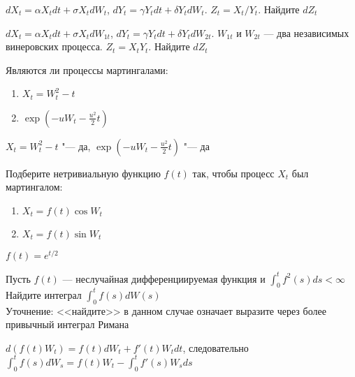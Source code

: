 \begin{problem}
 $dX_{t}=\alpha X_{t}dt+\sigma X_{t}dW_{t}$, $dY_{t}=\gamma Y_{t}dt+\delta Y_{t}dW_{t}$. $Z_{t}=X_{t}/Y_{t}$. Найдите $dZ_{t}$

\begin{sol}

\end{sol}
\end{problem}

\begin{problem}
 $dX_{t}=\alpha X_{t}dt+\sigma X_{t}dW_{1t}$, $dY_{t}=\gamma Y_{t}dt+\delta Y_{t}dW_{2t}$. $W_{1t}$ и $W_{2t}$ — два независимых винеровских процесса. $Z_{t}=X_{t}Y_{t}$. Найдите $dZ_{t}$

\begin{sol}

\end{sol}
\end{problem}

\begin{problem}
Являются ли процессы мартингалами:
\begin{enumerate}
\item $X_{t}=W_{t}^{2}-t$
\item  $\exp(-uW_{t}-\frac{u^{2}}{2}t)$
\end{enumerate}


\begin{sol}
$X_{t}=W_{t}^{2}-t$ "--- да, $\exp(-uW_{t}-\frac{u^{2}}{2}t)$ "--- да
\end{sol}
\end{problem}

\begin{problem}
Подберите нетривиальную функцию $f(t)$ так, чтобы процесс $X_t$ был мартингалом:
\begin{enumerate}
\item $X_t=f(t) \cos W_t$
\item $X_t=f(t) \sin W_t$
\end{enumerate}


\begin{sol}
$f(t)=e^{t/2}$
\end{sol}
\end{problem}




\begin{problem}
Пусть $f(t)$ — неслучайная дифференциируемая функция и $\int_{0}^{t}f^{2}(s)ds<\infty$ \\
Найдите интеграл $\int_{0}^{t}f(s)dW(s)$ \\
Уточнение: <<найдите>> в данном случае означает выразите через более привычный интеграл Римана

\begin{sol}
 $d(f(t)W_t)=f(t)dW_t+f'(t)W_tdt$, следовательно $\int_0^t f(s)dW_s=f(t)W_t-\int_0^t f'(s)W_sds$
\end{sol}
\end{problem}

